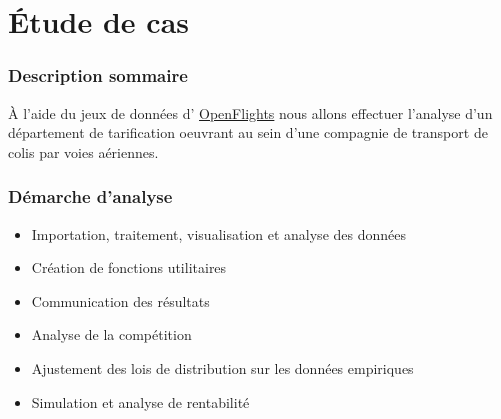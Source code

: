\section{Étude de cas}

\begin{frame}[fragile=singleslide]
  \frametitle{Description sommaire}

À l'aide du jeux de données d' \href{https://openflights.org/data.html}{OpenFlights} nous allons effectuer l'analyse d'un département de tarification oeuvrant au sein d'une compagnie de transport de colis par voies aériennes.
\end{frame}

\begin{frame}[fragile=singleslide]
  \frametitle{Démarche d'analyse}

  \begin{itemize}
  \item Importation, traitement, visualisation et analyse des données
  \item Création de fonctions utilitaires
  \item Communication des résultats
  \item Analyse de la compétition
  \item Ajustement des lois de distribution sur les données empiriques 
  \item Simulation et analyse de rentabilité
  \end{itemize}
\end{frame}

